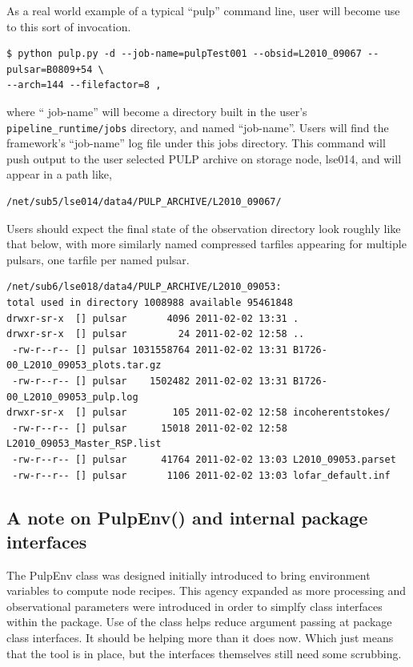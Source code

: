 \documentclass[a4paper,10pt,bibtotoc]{scrartcl}
\begin{document}
As a real world example of a typical ``pulp'' command line, user will become use to this sort of invocation.

\begin{verbatim}
$ python pulp.py -d --job-name=pulpTest001 --obsid=L2010_09067 --pulsar=B0809+54 \
--arch=144 --filefactor=8 ,
\end{verbatim}
where `` job-name'' will become a directory built in the user's
\verb|pipeline_runtime/jobs| directory, and named ``job-name''.  Users
will find the framework's ``job-name'' log file under this jobs
directory.  This command will push output to the user selected PULP
archive on storage node, lse014, and will appear in a path like,

\begin{verbatim}
/net/sub5/lse014/data4/PULP_ARCHIVE/L2010_09067/
\end{verbatim}
Users should expect the final state of the observation directory look
roughly like that below, with more similarly named compressed tarfiles appearing for
multiple pulsars, one tarfile per named pulsar.
\begin{verbatim}
/net/sub6/lse018/data4/PULP_ARCHIVE/L2010_09053:
total used in directory 1008988 available 95461848
drwxr-sr-x  [] pulsar       4096 2011-02-02 13:31 .
drwxr-sr-x  [] pulsar         24 2011-02-02 12:58 ..
 -rw-r--r-- [] pulsar 1031558764 2011-02-02 13:31 B1726-00_L2010_09053_plots.tar.gz
 -rw-r--r-- [] pulsar    1502482 2011-02-02 13:31 B1726-00_L2010_09053_pulp.log
drwxr-sr-x  [] pulsar        105 2011-02-02 12:58 incoherentstokes/
 -rw-r--r-- [] pulsar      15018 2011-02-02 12:58 L2010_09053_Master_RSP.list
 -rw-r--r-- [] pulsar      41764 2011-02-02 13:03 L2010_09053.parset
 -rw-r--r-- [] pulsar       1106 2011-02-02 13:03 lofar_default.inf
\end{verbatim}


\subsection{A note on PulpEnv() and internal package interfaces}
The PulpEnv class was designed initially introduced to bring environment variables
to compute node recipes.  This agency expanded as more processing and observational
parameters were introduced in order to simplfy class interfaces within the package.
Use of the class helps reduce argument passing at package class interfaces.  It should be helping more than it does now. Which just means that the tool is in place,
but the interfaces themselves still need some scrubbing.
\end{document}
